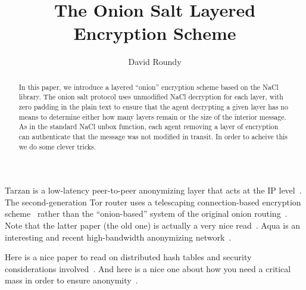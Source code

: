 \documentclass[letterpaper,twocolumn,amsmath,amssymb,pre,aps,10pt]{revtex4-1}
\begin{document}
\title{The Onion Salt Layered Encryption Scheme}
\author{David Roundy}

\begin{abstract}
  In this paper, we introduce a layered ``onion'' encryption scheme
  based on the NaCl library.  The onion salt protocol uses unmodified
  NaCl decryption for each layer, with zero padding in the plain text
  to ensure that the agent decrypting a given layer has no means to
  determine either how many layers remain or the size of the interior
  message.  As in the standard NaCl unbox function, each agent
  removing a layer of encryption can authenticate that the message was
  not modified in transit.  In order to acheive this we do some clever
  tricks.
\end{abstract}

\maketitle

Tarzan is a low-latency peer-to-peer anonymizing layer that acts at
the IP level~\cite{freedman2002tarzan}.  The second-generation Tor
router uses a telescaping connection-based encryption
scheme~\cite{dingledine2004tor} rather than the ``onion-based'' system
of the original onion routing~\cite{reed1998onionrouting}.  Note that
the latter paper (the old one) is actually a very nice
read~\cite{reed1998onionrouting}.  Aqua is an interesting and recent
high-bandwidth anonymizing network~\cite{leblond2013towards}.

Here is a nice paper to read on distributed hash tables and security
considerations involved~\cite{sit2002security}.  And here is a nice
one about how you need a critical mass in order to ensure
anonymity~\cite{dingledine2006anonymity}.

\end{document}
